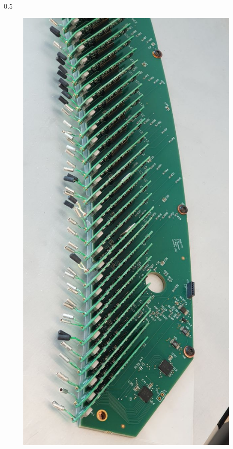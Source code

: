 \documentclass{beamer}
\begin{document}
\begin{frame}
\begin{columns}
\begin{column}{0.5\framewidth}
\begin{figure}[!h]
      \includegraphics[angle=90,width=1.1\columnwidth]{figures/jpg/photo_6028424923279639562_y.jpg}
     \label{fig:normalhits}
\end{figure}
\end{column}
\end{columns}
\end{frame}
\end{document}
